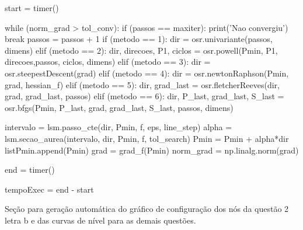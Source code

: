 \documentclass[10pt, a4paper]{article}
\begin{document}
\begin{python}
  start = timer()

  while (norm_grad > tol_conv):
      if (passos == maxiter):
          print('Nao convergiu')
          break
      passos = passos + 1
      if (metodo == 1):
          dir = osr.univariante(passos, dimens)
      elif (metodo == 2):
          dir, direcoes, P1, ciclos = osr.powell(Pmin, P1, direcoes,passos, ciclos, dimens)
      elif (metodo == 3):
          dir = osr.steepestDescent(grad)
      elif (metodo == 4):
          dir = osr.newtonRaphson(Pmin, grad, hessian_f)
      elif (metodo == 5):
          dir, grad_last = osr.fletcherReeves(dir, grad, grad_last, passos)
      elif (metodo == 6):
          dir, P_last, grad_last, S_last = osr.bfgs(Pmin, P_last, grad, grad_last, S_last, passos, dimens)
      
      intervalo = lsm.passo_cte(dir, Pmin, f, eps, line_step)
      alpha = lsm.secao_aurea(intervalo, dir, Pmin, f, tol_search)
      Pmin = Pmin + alpha*dir
      listPmin.append(Pmin)
      grad = grad_f(Pmin)
      norm_grad = np.linalg.norm(grad)    

  end = timer()

  tempoExec = end - start
\end{python}

Seção para geração automática do gráfico de configuração dos nós da questão 2 letra b e das curvas de nível para as demais questões.
\end{document}

